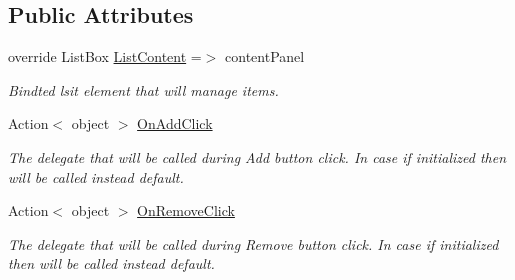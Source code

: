 \subsection*{Public Attributes}
\begin{DoxyCompactItemize}
\item 
override List\+Box \mbox{\hyperlink{class_wpf_handler_1_1_u_i_1_1_controls_1_1_auto_collection_a144774a121d36e2207fd0e39dd67a074}{List\+Content}} =$>$ content\+Panel
\begin{DoxyCompactList}\small\item\em Bindted lsit element that will manage items. \end{DoxyCompactList}\item 
Action$<$ object $>$ \mbox{\hyperlink{class_wpf_handler_1_1_u_i_1_1_controls_1_1_auto_collection_a996c2d451bb6e072a9ff03ce6a21b5fc}{On\+Add\+Click}}
\begin{DoxyCompactList}\small\item\em The delegate that will be called during Add button click. In case if initialized then will be called instead default. \end{DoxyCompactList}\item 
Action$<$ object $>$ \mbox{\hyperlink{class_wpf_handler_1_1_u_i_1_1_controls_1_1_auto_collection_a6130a353d0fadfaaf9bc17881406354f}{On\+Remove\+Click}}
\begin{DoxyCompactList}\small\item\em The delegate that will be called during Remove button click. In case if initialized then will be called instead default. \end{DoxyCompactList}\end{DoxyCompactItemize}
